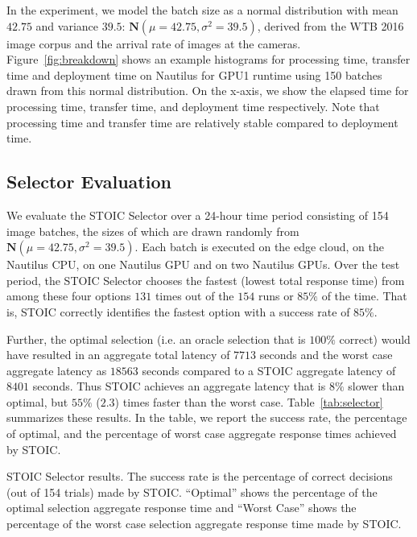 In the experiment, we model the batch size as a normal distribution with mean $42.75$ and variance $39.5$: $\mathbf{N}(\mu = 42.75, \sigma^2 = 39.5)$, derived from the WTB 2016 image corpus and the arrival rate of images at the cameras. Figure~\ref{fig:breakdown} shows an example histograms for processing time, transfer time and deployment time on Nautilus for GPU1 runtime using 150 batches drawn from this normal distribution. On the x-axis, we show the elapsed time for processing time, transfer time, and deployment time respectively.  Note that processing time and transfer time are relatively stable compared to deployment time. 

\subsection{Selector Evaluation}

We evaluate the STOIC Selector over a 24-hour time period consisting of 154 image batches, the sizes of which are drawn randomly from $\mathbf{N}(\mu = 42.75, \sigma^2 = 39.5)$.  Each batch is executed on the edge cloud, on the Nautilus CPU, on one Nautilus GPU and on two Nautilus GPUs. Over the test period, the STOIC Selector chooses the fastest (lowest total response time) from among these four options $131$ times out of the $154$ runs or $85\%$ of the time. That is, STOIC correctly identifies the fastest option with a success rate of $85\%$.

Further, the optimal selection (i.e. an oracle selection that is $100\%$ correct) would have resulted in an aggregate total latency of $7713$ seconds and the worst case aggregate latency as $18563$ seconds compared to a STOIC aggregate latency of $8401$ seconds.  Thus STOIC achieves an aggregate latency that is $8\%$ slower than optimal, but $55\%$ ($2.3$) times faster than the worst case. Table~\ref{tab:selector} summarizes these results. In the table, we report the success rate, the percentage of optimal, and the percentage of worst case aggregate response times achieved by STOIC. 

\begin{table}[t] 
\begin{centering}
\captionsetup{justification=centering}

\end{centering}
\caption{
STOIC Selector results. The success rate is the percentage of correct decisions
(out of 154 trials) made by STOIC.  ``Optimal'' shows the percentage of the
optimal selection aggregate response time and ``Worst Case'' shows the percentage of the worst case 
selection aggregate response time made by STOIC.}
\label{tab:selector}
\end{table}

